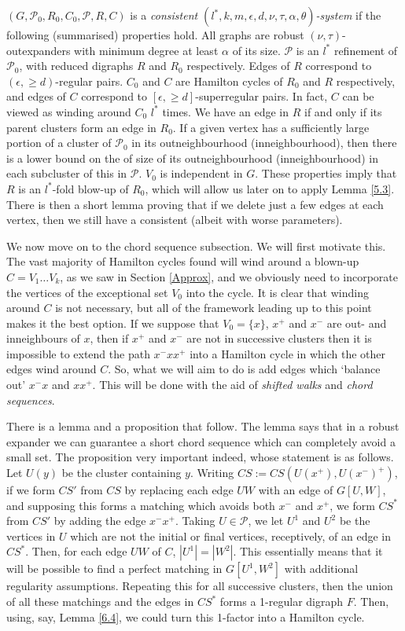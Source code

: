 \documentclass[10pt,letterpaper, reqno]{amsart}
\theoremstyle{definition}
\numberwithin{equation}{section}
\begin{document}
$(G,\mathcal{P}_0, R_0,C_0,\mathcal{P},R,C)$ is a \textit{consistent $(l^*,k,m,\epsilon,d,\nu,\tau,\alpha,\theta)$-system} if the following (summarised) properties hold. All graphs are robust $(\nu,\tau)$-outexpanders with minimum degree at least $\alpha$ of its size. $\mathcal{P}$ is an $l^*$ refinement of $\mathcal{P}_0$, with reduced digraphs $R$ and $R_0$ respectively. Edges of $R$ correspond to $(\epsilon,\geq d)$-regular pairs. $C_0$ and $C$ are Hamilton cycles of $R_0$ and $R$ respectively, and edges of $C$ correspond to $[\epsilon,\geq d]$-superregular pairs. In fact, $C$ can be viewed as winding around $C_0$ $l^*$ times. We have an edge in $R$ if and only if its parent clusters form an edge in $R_0$. If a given vertex has a sufficiently large portion of a cluster of $\mathcal{P}_0$ in its outneighbourhood (inneighbourhood), then there is a lower bound on the of size of its outneighbourhood (inneighbourhood) in each subcluster of this in $\mathcal{P}$. $V_0$ is independent in $G$.  These properties imply that $R$ is an $l^*$-fold blow-up of $R_0$, which will allow us later on to apply Lemma \ref{5.3}. There is then a short lemma proving that if we delete just a few edges at each vertex, then we still have a consistent (albeit with worse parameters).

We now move on to the chord sequence subsection. We will first motivate this. The vast majority of Hamilton cycles found will wind around a blown-up $C=V_1\dots V_k$, as we saw in Section \ref{Approx}, and we obviously need to incorporate the vertices of the exceptional set $V_0$ into the cycle. It is clear that winding around $C$ is not necessary, but all of the framework leading up to this point makes it the best option. If we suppose that $V_0=\{x\}$, $x^+$ and $x^-$ are out- and inneighbours of $x$, then if $x^+$ and $x^-$ are not in successive clusters then it is impossible to extend the path $x^-xx^+$ into a Hamilton cycle in which the other edges wind around $C$. So, what we will aim to do is add edges which `balance out' $x^-x$ and $xx^+$. This will be done with the aid of \textit{shifted walks} and \textit{chord sequences}. 

There is a lemma and a proposition that follow. The lemma says that in a robust expander we can guarantee a short chord sequence which can completely avoid a small set. The proposition very important indeed, whose statement is as follows. Let $U(y)$ be the cluster containing $y$. Writing $CS := CS(U(x^+),U(x^-)^+)$, if we form $CS'$ from $CS$ by replacing each edge $UW$ with an edge of $G[U,W]$, and supposing this forms a matching which avoids both $x^-$ and $x^+$, we form $CS^*$ from $CS'$ by adding the edge $x^-x^+$. Taking $U \in \mathcal{P}$, we let $U^1$ and $U^2$ be the vertices in $U$ which are not the initial or final vertices, receptively, of an edge in $CS^*$. Then, for each edge $UW$ of $C$, $|U^1|=|W^2|$. This essentially means that it will be possible to find a perfect matching in $G[U^1,W^2]$ with additional regularity assumptions. Repeating this for all successive clusters, then the union of all these matchings and the edges in $CS^*$ forms a 1-regular digraph $F$. Then, using, say, Lemma \ref{6.4}, we could turn this 1-factor into a Hamilton cycle.
\end{document}
